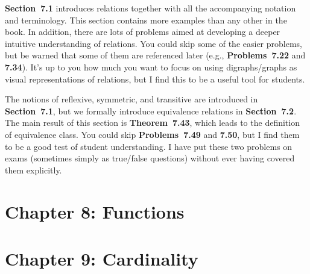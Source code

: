 \documentclass[11pt]{article}%
\newcommand{\blankline}{\pagebreak[2]\vspace{.5\baselineskip}}
\begin{document}
\blankline

\textbf{Section~7.1} introduces relations together with all the accompanying notation and terminology. This section contains more examples than any other in the book.  In addition, there are lots of problems aimed at developing a deeper intuitive understanding of relations.  You could skip some of the easier problems, but be warned that some of them are referenced later (e.g., \textbf{Problems~7.22} and \textbf{7.34}).  It's up to you how much you want to focus on using digraphs/graphs as visual representations of relations, but I find this to be a useful tool for students.

\blankline

The notions of reflexive, symmetric, and transitive are introduced in \textbf{Section~7.1}, but we formally introduce equivalence relations in \textbf{Section~7.2}. The main result of this section is \textbf{Theorem~7.43}, which leads to the definition of equivalence class.  You could skip \textbf{Problems~7.49} and \textbf{7.50}, but I find them to be a good test of student understanding.  I have put these two problems on exams (sometimes simply as true/false questions) without ever having covered them explicitly.


\section*{Chapter 8: Functions}


\section*{Chapter 9: Cardinality}
\end{document}

